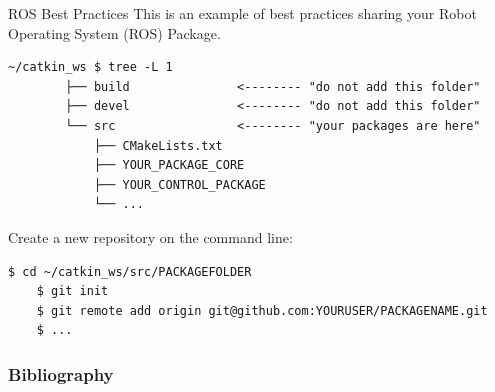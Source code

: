 \documentclass[aspectratio=169]{beamer}
\begin{document}
\begin{frame}[fragile]{ROS Best Practices}
	This is an example of best practices sharing your Robot Operating System (ROS) Package.

	\begin{lstlisting}[style=ascii-tree]
		~/catkin_ws $ tree -L 1
		├── build				<-------- "do not add this folder"
		├── devel				<-------- "do not add this folder"
		└── src					<-------- "your packages are here"
			├── CMakeLists.txt
			├── YOUR_PACKAGE_CORE
			├── YOUR_CONTROL_PACKAGE
			└── ...
		\end{lstlisting}

	Create a new repository on the command line:

		\begin{lstlisting}[language=bash]
	$ cd ~/catkin_ws/src/PACKAGEFOLDER
	$ git init
	$ git remote add origin git@github.com:YOURUSER/PACKAGENAME.git
	$ ...
		\end{lstlisting}
\end{frame}

\begin{frame}[t, allowframebreaks]
	\frametitle{Bibliography}
	
\end{frame}
\end{document}
